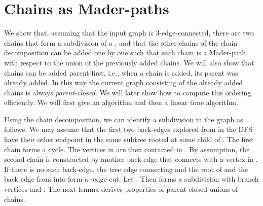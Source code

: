 \documentclass[paper=a4]{scrartcl}
\begin{document}
\section{Chains as Mader-paths}\label{Chains as Mader-paths}

We show that, assuming that the input graph is 3-edge-connected, there are two chains that form a subdivision of a , and that the other chains of the chain decomposition can be added one by one such that each chain is a Mader-path with respect to the union of the previously added chains. We will also show that chains can be added parent-first, i.e., when a chain is added, its parent was already added. In this way the current graph  consisting of the already added chains is always \emph{parent-closed}. We will later show how to compute this ordering efficiently. We will first give an  algorithm and then a linear time algorithm.




Using the chain decomposition, we can identify a  subdivision in the graph as follows. We may assume that the first two back-edges explored from  in the DFS have their other endpoint in the same subtree  rooted at some child of . The first chain  forms a cycle. The vertices in  are then contained in . By assumption, the second chain is constructed by another back-edge that connects  with a vertex in . If there is no such back-edge, the tree edge connecting  and the root of  and the back edge from  into  form a -edge cut. 
Let . Then  forms a  subdivision with branch vertices  and . The next lemma derives properties of parent-closed unions of chains.
\end{document}
